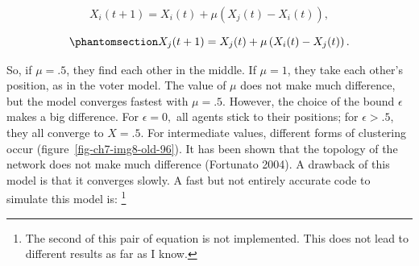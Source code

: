 \documentclass[
  a4paper,
  DIV=11,
  numbers=noendperiod,
  oneside]{scrreprt}
\begin{document}
\[X_{i}(t + 1) = X_{i}(t) + \mu(X_{j}(t) - X_{i}(t)),\]

\begin{equation}\phantomsection\label{eq-ch7-2-old-51}{X_{j}(t + 1) = X_{j}(t) + \mu\left( X_{i}(t) - X_{j}(t) \right).}\end{equation}

So, if \(\mu = .5\), they find each other in the middle. If \(\mu = 1\),
they take each other's position, as in the voter model. The value of
\(\mu\) does not make much difference, but the model converges fastest
with \(\mu = .5\). However, the choice of the bound \(\epsilon\) makes a
big difference. For \(\epsilon = 0,\) all agents stick to their
positions; for \(\epsilon > .5\), they all converge to \(X = .5\). For
intermediate values, different forms of clustering occur
(figure~\ref{fig-ch7-img8-old-96}). It has been shown that the topology
of the network does not make much difference (Fortunato 2004). A
drawback of this model is that it converges slowly. A fast but not
entirely accurate code to simulate this model is: \footnote{The second
  of this pair of equation is not implemented. This does not lead to
  different results as far as I know.}
\end{document}

